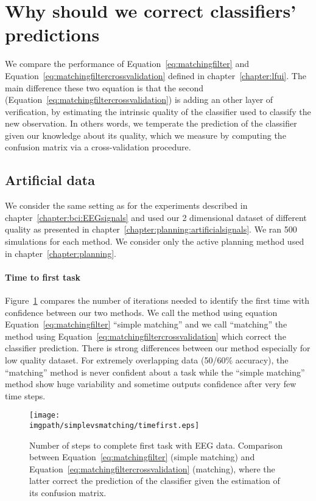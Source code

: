 
\section{Why should we correct classifiers' predictions}
\label{chapter:limitiations:simplevsmatching}

We compare the performance of Equation~\ref{eq:matchingfilter} and Equation~\ref{eq:matchingfiltercrossvalidation} defined in chapter~\ref{chapter:lfui}. The main difference these two equation is that the second (Equation~\ref{eq:matchingfiltercrossvalidation}) is adding an other layer of verification, by estimating the intrinsic quality of the classifier used to classify the new observation. In others words, we temperate the prediction of the classifier given our knowledge about its quality, which we measure by computing the confusion matrix via a cross-validation procedure.

\subsection{Artificial data}

We consider the same setting as for the experiments described in chapter~\ref{chapter:bci:EEGsignals} and used our 2 dimensional dataset of different quality as presented in chapter~\ref{chapter:planning:artificialsignals}. We ran 500 simulations for each method. We consider only the active planning method used in chapter~\ref{chapter:planning}.

\paragraph{Time to first task} Figure~\ref{fig:timefirst_simplevsmatching} compares the number of iterations needed to identify the first time with confidence between our two methods. We call the method using equation Equation~\ref{eq:matchingfilter} ``simple matching'' and we call ``matching'' the method using Equation~\ref{eq:matchingfiltercrossvalidation} which correct the classifier prediction. There is strong differences between our method especially for low quality dataset. For extremely overlapping data (50/60\% accuracy), the ``matching'' method is never confident about a task while the ``simple matching'' method show huge variability and sometime outputs confidence after very few time steps. 

\begin{figure}[!ht]
\centering
\texttt{[image: \\imgpath/simplevsmatching/timefirst.eps]}
\caption{Number of steps to complete first task with EEG data. Comparison between Equation~\ref{eq:matchingfilter} (simple matching) and Equation~\ref{eq:matchingfiltercrossvalidation} (matching), where the latter correct the prediction of the classifier given the estimation of its confusion matrix.}
\label{fig:timefirst_simplevsmatching}
\end{figure} 

